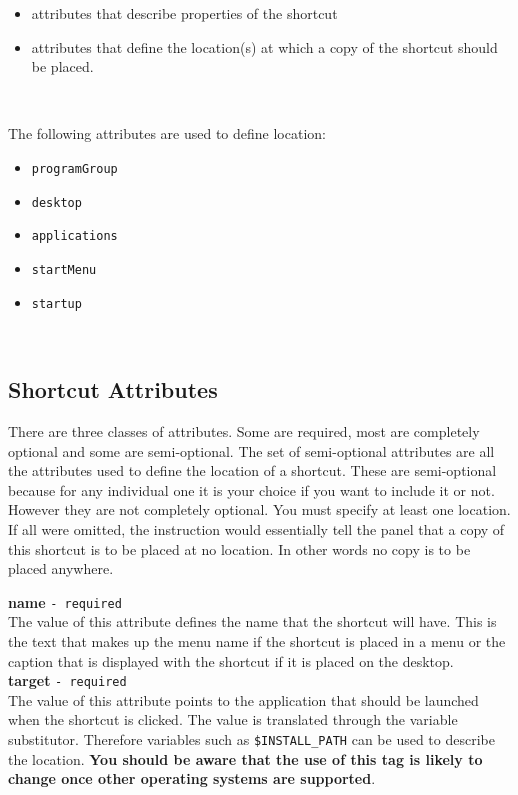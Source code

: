 \begin{itemize}
\item attributes that describe properties of the shortcut
\item attributes that define the location(s) at which a copy of the
      shortcut should be placed.
\end{itemize}\

The following attributes are used to define location:
\begin{itemize}
\item \texttt{programGroup}
\item \texttt{desktop}
\item \texttt{applications}
\item \texttt{startMenu}
\item \texttt{startup}
\end{itemize}\

\subsection{Shortcut Attributes}

There are three classes of attributes. Some are required, most are
completely optional and some are semi-optional. The set of semi-optional
attributes are all the attributes used to define the location of a
shortcut. These are semi-optional because for any individual one it is
your choice if you want to include it or not. However they are not
completely optional. You must specify at least one location. If all were
omitted, the instruction would essentially tell the panel that a copy of
this shortcut is to be placed at no location. In other words no copy is
to be placed anywhere.

\textbf{name} \texttt{- required}\\

The value of this attribute defines the name that the shortcut will
have. This is the text that makes up the menu name if the shortcut is
placed in a menu or the caption that is displayed with the shortcut if
it is placed on the desktop.\\

\textbf{target} \texttt{- required}\\

The value of this attribute points to the application that should be
launched when the shortcut is clicked. The value is translated through
the variable substitutor. Therefore variables such as
\texttt{\$INSTALL\_PATH} can be used to describe the location.
\textbf{You should be aware that the use of this tag is likely to change
once other operating systems are supported}.\\


